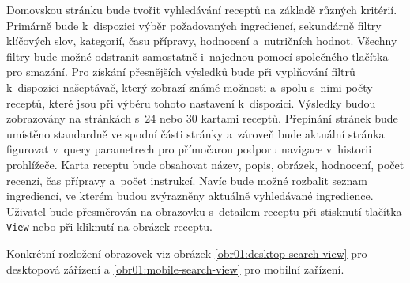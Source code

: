 Domovskou stránku bude tvořit vyhledávání receptů na základě různých kritérií. Primárně bude k~dispozici výběr požadovaných ingrediencí, sekundárně filtry klíčových slov, kategorií, času přípravy, hodnocení a~nutričních hodnot. Všechny filtry bude možné odstranit samostatně i~najednou pomocí společného tlačítka pro smazání. Pro získání přesnějších výsledků bude při vyplňování filtrů k~dispozici našeptávač, který zobrazí známé možnosti a~spolu s~nimi počty receptů, které jsou při výběru tohoto nastavení k~dispozici. Výsledky budou zobrazovány na stránkách s~$24$ nebo $30$ kartami receptů. Přepínání stránek bude umístěno standardně ve spodní části stránky a~zároveň bude aktuální stránka figurovat v~query parametrech pro přímočarou podporu navigace v~historii prohlížeče. Karta receptu bude obsahovat název, popis, obrázek, hodnocení, počet recenzí, čas přípravy a~počet instrukcí. Navíc bude možné rozbalit seznam ingrediencí, ve kterém budou zvýrazněny aktuálně vyhledávané ingredience. Uživatel bude přesměrován na obrazovku s~detailem receptu při stisknutí tlačítka \texttt{View} nebo při kliknutí na obrázek receptu.

Konkrétní rozložení obrazovek viz obrázek \ref{obr01:desktop-search-view} pro desktopová zářízení a \ref{obr01:mobile-search-view} pro mobilní zařízení.

